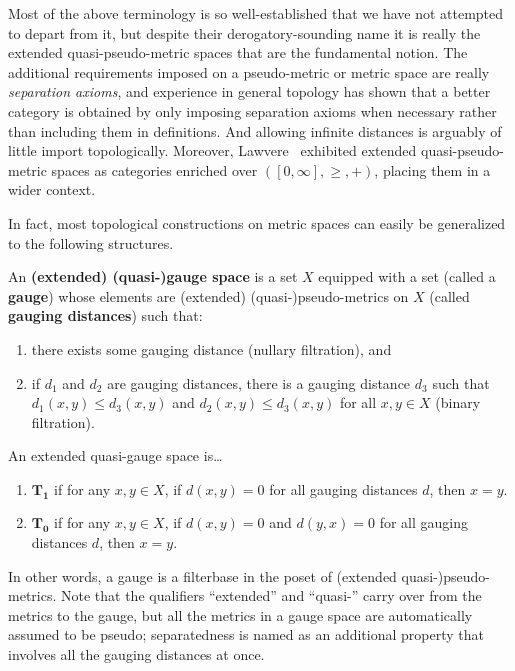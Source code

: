 \documentclass{article}
\def\Rp{[0,\infty]}
\begin{document}
Most of the above terminology is so well-established that we have not attempted to depart from it, but despite their derogatory-sounding name it is really the extended quasi-pseudo-metric spaces that are the fundamental notion.
The additional requirements imposed on a pseudo-metric or metric space are really \emph{separation axioms}, and experience in general topology has shown that a better category is obtained by only imposing separation axioms when necessary rather than including them in definitions.
And allowing infinite distances is arguably of little import topologically.
Moreover, Lawvere~\cite{lawvere:metric-spaces} exhibited extended quasi-pseudo-metric spaces as categories enriched over $(\Rp,\ge,+)$, placing them in a wider context.

In fact, most topological constructions on metric spaces can easily be generalized to the following structures.

\begin{defn}
  An \textbf{(extended) (quasi-)gauge space} is a set $X$ equipped with a set (called a \textbf{gauge}) whose elements are (extended) (quasi-)pseudo-metrics on $X$ (called \textbf{gauging distances}) such that:
  \begin{enumerate}
  \item there exists some gauging distance (nullary filtration), and
  \item if $d_1$ and $d_2$ are gauging distances, there is a gauging distance $d_3$ such that $d_1(x,y)\le d_3(x,y)$ and $d_2(x,y)\le d_3(x,y)$ for all $x,y\in X$ (binary filtration).
  \end{enumerate}
  An extended quasi-gauge space is\dots
  \begin{enumerate}[resume]
  \item $\mathbf{T_1}$ if for any $x,y\in X$, if $d(x,y)=0$ for all gauging distances $d$, then $x=y$.
  \item $\mathbf{T_0}$ if for any $x,y\in X$, if $d(x,y)=0$ and $d(y,x)=0$ for all gauging distances $d$, then $x=y$.
  \end{enumerate}
\end{defn}

In other words, a gauge is a filterbase in the poset of (extended quasi-)pseudo-metrics.
Note that the qualifiers ``extended'' and ``quasi-'' carry over from the metrics to the gauge, but all the metrics in a gauge space are automatically assumed to be pseudo; separatedness is named as an additional property that involves all the gauging distances at once.
\end{document}
